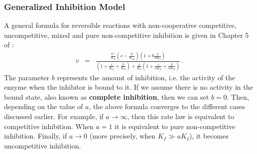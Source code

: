 \documentclass[12pt,a4paper]{article}
\begin{document}
\subsubsection{Generalized Inhibition Model}
A general formula for reversible reactions with non-cooperative competitive, uncompetitive, mixed and pure non-competitive inhibition is given in Chapter 5 of \citet{Sauro2011-op}:
\begin{eqnarray}\label{eq:gen_inh_model}
    v &=& \frac{\frac{V^+}{K_S}\left(s - \frac{p}{K_{eq}}\right)\left(1 + b \frac{x}{aK_I}\right)}{\left(1 + \frac{s}{K_S} + \frac{p}{K_P}\right) + \frac{x}{K_I} \left(1 + \frac{s}{aK_S} + \frac{p}{aK_P}\right)}\,.
\end{eqnarray}
The parameter $b$ represents the amount of inhibition, i.e. the activity of the enzyme when the inhibitor is bound to it. If we assume there is no activity in the bound state, also known as \textbf{complete inhibition}, then we can set $b = 0$. 
Then, depending on the value of $a$, the above formula converges to the different cases discussed earlier. For example, if $a \rightarrow \infty$, then this rate law is equivalent to competitive inhibition. When $a = 1$ it is equivalent to pure non-competitive inhibition. Finally, if $a \rightarrow 0$ (more precisely, when $K_I \gg a K_I$), it becomes uncompetitive inhibition.
\end{document}
